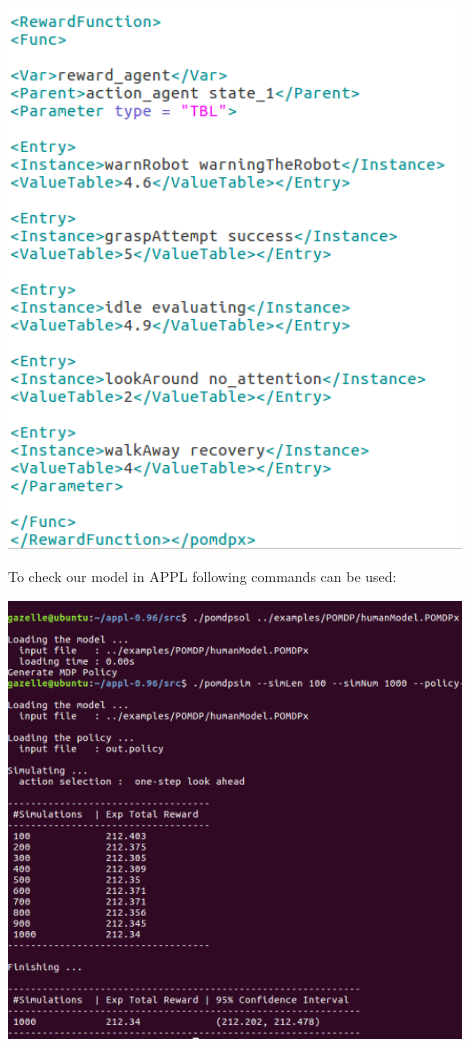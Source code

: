 \begin{minipage}{0.8\textwidth}
\centering
	\includegraphics[width=12cm]{Pictures/func/MDP/MDP4.png}
	\label{fig:MDP4}
\end{minipage}

To check our model in APPL following commands can be used:

\begin{minipage}{0.8\textwidth}
\centering
	\includegraphics[width=12cm]{Pictures/func/MDP/MDP5.png}
	\label{fig:MDP5}
\end{minipage}

